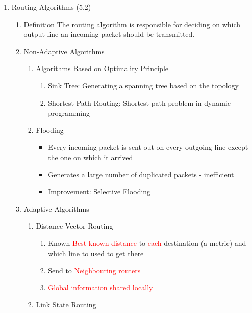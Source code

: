 \documentclass[a4paper,10pt]{article}
\newcommand{\red}[1]{\textcolor{red}{#1}}
\begin{document}
\begin{enumerate}
  \item Routing Algorithms (5.2)
    \begin{enumerate}
      \item Definition
        \newline The routing algorithm is responsible for deciding on which output line an incoming packet should be transmitted.
      \item Non-Adaptive Algorithms
        \begin{enumerate}
          \item Algorithms Based on Optimality Principle
            \begin{enumerate}
              \item Sink Tree: Generating a spanning tree based on the topology
              \item Shortest Path Routing: Shortest path problem in dynamic programming
            \end{enumerate}
          \item Flooding
            \begin{itemize}
              \item Every incoming packet is sent out on every outgoing line except the one on which it arrived
              \item Generates a large number of duplicated packets - inefficient
              \item Improvement: Selective Flooding
            \end{itemize}
        \end{enumerate}
      \item Adaptive Algorithms
        \begin{enumerate}
          \item Distance Vector Routing
            \begin{enumerate}
              \item Known
                \newline\red{Best known distance} to \red{each} destination (a metric) and which line to used to get there
              \item Send to
                \newline\red{Neighbouring routers}
              \item \red{Global information shared locally}
            \end{enumerate}
          \item Link State Routing
            \begin{enumerate}

\end{enumerate}
\end{enumerate}
\end{enumerate}
\end{enumerate}
\end{document}
